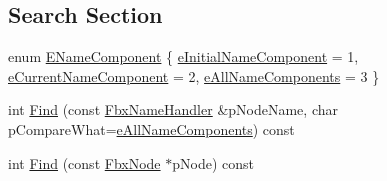 \subsection*{Search Section}
\begin{DoxyCompactItemize}
\item 
enum \hyperlink{class_fbx_pose_a0ab145961bb4163251d1a29f2fe37364}{E\+Name\+Component} \{ \hyperlink{class_fbx_pose_a0ab145961bb4163251d1a29f2fe37364a16088b3c16a34d19f5513f794b36ca18}{e\+Initial\+Name\+Component} = 1, 
\hyperlink{class_fbx_pose_a0ab145961bb4163251d1a29f2fe37364ae900e062dc3eb1e9bf493d7980462851}{e\+Current\+Name\+Component} = 2, 
\hyperlink{class_fbx_pose_a0ab145961bb4163251d1a29f2fe37364abc7067764b4a5c2daecef3ac215124ff}{e\+All\+Name\+Components} = 3
 \}
\item 
int \hyperlink{class_fbx_pose_a427820ec28ffde99a648991078d6ed1c}{Find} (const \hyperlink{class_fbx_name_handler}{Fbx\+Name\+Handler} \&p\+Node\+Name, char p\+Compare\+What=\hyperlink{class_fbx_pose_a0ab145961bb4163251d1a29f2fe37364abc7067764b4a5c2daecef3ac215124ff}{e\+All\+Name\+Components}) const
\item 
int \hyperlink{class_fbx_pose_a3314b102674679ed6ee9f6bdf386739e}{Find} (const \hyperlink{class_fbx_node}{Fbx\+Node} $\ast$p\+Node) const
\end{DoxyCompactItemize}
